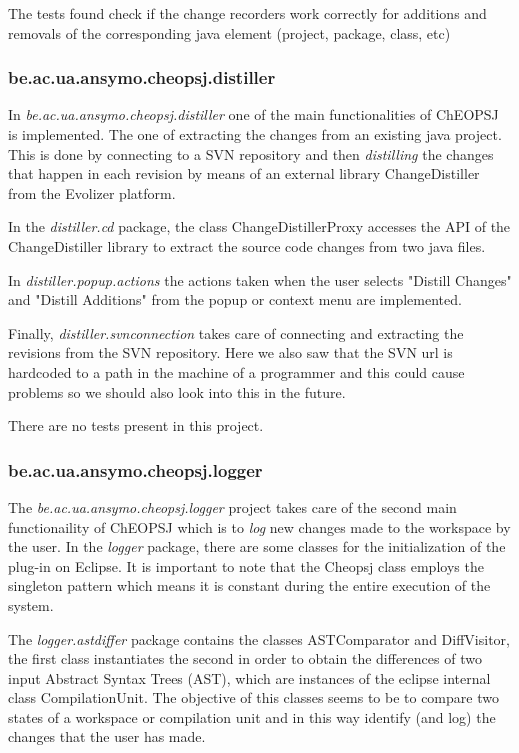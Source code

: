 \documentclass{article}
\begin{document}
The tests found check if the change recorders work correctly for additions and removals of the corresponding java element (project, package, class, etc)

\subsubsection{be.ac.ua.ansymo.cheopsj.distiller}
In \emph{be.ac.ua.ansymo.cheopsj.distiller} one of the main functionalities of ChEOPSJ is implemented. The one of extracting the changes from an existing java project. This is done by connecting to a SVN repository and then \emph{distilling} the changes that happen in each revision by means of an external library ChangeDistiller from the Evolizer platform.

In the \emph{distiller.cd} package, the class ChangeDistillerProxy accesses the API of the ChangeDistiller library to extract the source code changes from two java files.

In \emph{distiller.popup.actions} the actions taken when the user selects "Distill Changes" and "Distill Additions" from the popup or context menu are implemented. 

Finally, \emph{distiller.svnconnection} takes care of connecting and extracting the revisions from the SVN repository. Here we also saw that the SVN url is hardcoded to a path in the machine of a programmer and this could cause problems so we should also look into this in the future.

There are no tests present in this project.

\subsubsection{be.ac.ua.ansymo.cheopsj.logger}
The \emph{be.ac.ua.ansymo.cheopsj.logger} project takes care of the second main functionaility of ChEOPSJ which is to \emph{log} new changes made to the workspace by the user. In the \emph{logger} package, there are some classes for the initialization of the plug-in on Eclipse. It is important to note that the Cheopsj class employs the singleton pattern which means it is constant during the entire execution of the system.

The \emph{logger.astdiffer} package contains the classes ASTComparator and DiffVisitor, the first class instantiates the second in order to obtain the differences of two input Abstract Syntax Trees (AST), which are instances of the eclipse internal class CompilationUnit. The objective of this classes seems to be to compare two states of a workspace or compilation unit and in this way identify (and log) the changes that the user has made.
\end{document}
